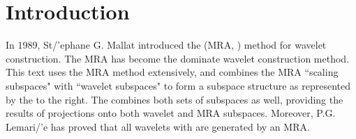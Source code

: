 \section{Introduction}
%
%
%
%
\begin{minipage}{\tw-65mm}
  In 1989, St{/'e}phane G. Mallat introduced the  (MRA, )
  method for wavelet construction. The MRA has become the dominate wavelet construction method.
  This text uses the MRA method extensively, 
  and combines the MRA ``scaling subspaces"  with ``wavelet subspaces" 
  to form a subspace structure as represented by the 
   to the right.
  The  combines both sets of subspaces as well, 
  providing the results of projections onto both wavelet and MRA subspaces.
  Moreover, P.G. Lemari{/'e} has proved that all wavelets with  are generated by an MRA.\footnotemark
\end{minipage}\hfill%

